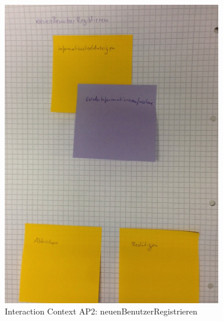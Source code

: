 \begin{figure}[H]
\centering
\includegraphics[angle=90, width=0.85\textwidth]  {./images/abstract/version2/neuenBenutzerRegistrieren.JPG}
\caption{Interaction Context AP2: neuenBenutzerRegistrieren}
\label{interfaceContents41}
\end{figure}

